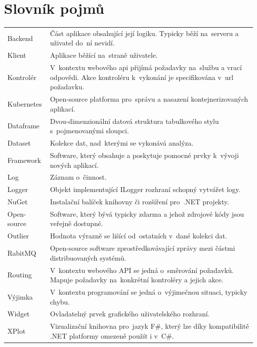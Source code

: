 \chapter{Slovník pojmů}
\label{priloha-A}

\renewcommand*{\arraystretch}{1.4}
\begin{longtable}{p{3cm}p{11.2cm}}
Backend & Část aplikace obsahující její logiku. Typicky běží na~serveru a uživatel do~ní nevidí.\\

Klient & Aplikace běžící na~straně uživatele.\\

Kontrolér & V~kontextu webového api přijímá požadavky na~službu a vrací odpovědi. Akce kontroléru k~vykonání je specifikována v~url požadavku.\\

Kubernetes & Open-source platforma pro~správu a nasazení kontejnerizovaných aplikací.\\

Dataframe & Dvou-dimenzionální datová struktura tabulkového stylu s~pojmenovanými sloupci.\\

Dataset & Kolekce dat, nad~kterými se vykonává analýza.\\

Framework & Software, který obsahuje a poskytuje pomocné prvky k~vývoji nových aplikací.\\

Log & Záznam o~činnost.\\

Logger & Objekt implementující ILogger rozhraní schopný vytvářet logy.\\

NuGet & Instalační balíček knihovny či rozšíření pro~.NET projekty.\\

Open-source & Software, který bývá typicky zdarma a jehož zdrojové kódy jsou veřejně dostupné.\\

Outlier & Hodnota výrazně se lišící od~ostatních v~dané kolekci dat.\\

RabitMQ & Open-source software zprostředkovávající zprávy mezi částmi distribuovaných systémů.\\

Routing & V~kontextu webového API se jedná o~směrování požadavků. Mapuje požadavky na~konkrétní kontroléry a jejich akce.\\

Výjimka & V~kontextu programování se jedná o~výjimečnou situaci, typicky chybu. \\

Widget & Ovladatelný prvek grafického uživatelského rozhraní.\\

XPlot & Vizualizační knihovna pro~jazyk F\#, který lze díky kompatibilitě .NET platformy omezeně použít i v~C\#.
\end{longtable}

